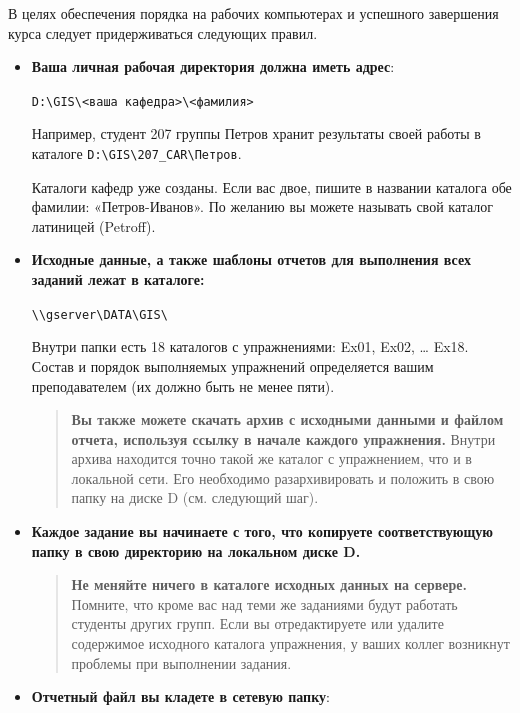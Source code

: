 \documentclass[]{book}
\theoremstyle{definition}
\theoremstyle{definition}
\theoremstyle{definition}
\theoremstyle{remark}
\begin{document}
В целях обеспечения порядка на рабочих компьютерах и успешного
завершения курса следует придерживаться следующих правил.

\begin{itemize}
\item
  \textbf{Ваша личная рабочая директория должна иметь адрес}:

  \texttt{D:\textbackslash{}GIS\textbackslash{}\textless{}ваша\ кафедра\textgreater{}\textbackslash{}\textless{}фамилия\textgreater{}}

  Например, студент 207 группы Петров хранит результаты своей работы в
  каталоге
  \texttt{D:\textbackslash{}GIS\textbackslash{}207\_CAR\textbackslash{}Петров}.

  Каталоги кафедр уже созданы. Если вас двое, пишите в названии каталога
  обе фамилии: «Петров-Иванов». По желанию вы можете называть свой
  каталог латиницей (Petroff).
\item
  \textbf{Исходные данные, а также шаблоны отчетов для выполнения всех
  заданий лежат в каталоге:}

  \texttt{\textbackslash{}\textbackslash{}gserver\textbackslash{}DATA\textbackslash{}GIS\textbackslash{}}

  Внутри папки есть 18 каталогов с упражнениями: Ex01, Ex02, \ldots{}
  Ex18. Состав и порядок выполняемых упражнений определяется вашим
  преподавателем (их должно быть не менее пяти).

  \begin{quote}
  \textbf{Вы также можете скачать архив с исходными данными и файлом
  отчета, используя ссылку в начале каждого упражнения.} Внутри архива
  находится точно такой же каталог с упражнением, что и в локальной
  сети. Его необходимо разархивировать и положить в свою папку на диске
  D (см. следующий шаг).
  \end{quote}
\item
  \textbf{Каждое задание вы начинаете с того, что копируете
  соответствующую папку в свою директорию на локальном диске D.}

  \begin{quote}
  \textbf{Не меняйте ничего в каталоге исходных данных на сервере.}
  Помните, что кроме вас над теми же заданиями будут работать студенты
  других групп. Если вы отредактируете или удалите содержимое исходного
  каталога упражнения, у ваших коллег возникнут проблемы при выполнении
  задания.
  \end{quote}
\item
  \textbf{Отчетный файл вы кладете в сетевую папку}:


\end{itemize}
\end{document}
